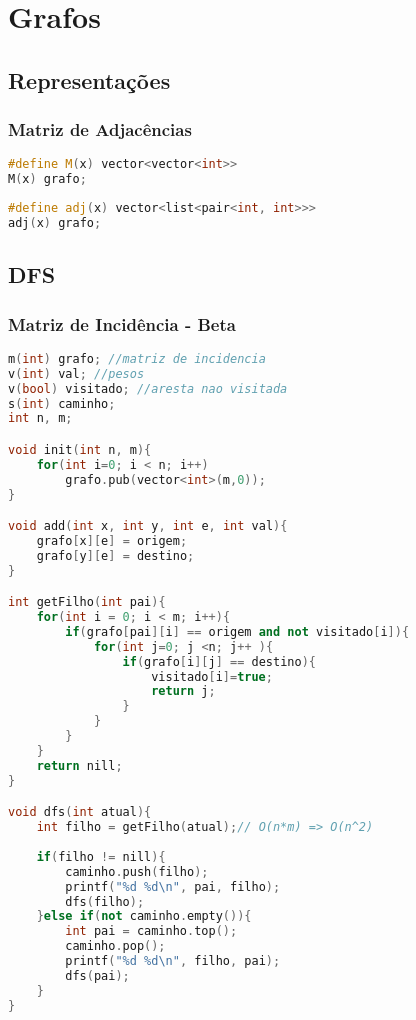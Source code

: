 \chapter{Grafos}

\section{Representações}
\subsection*{Matriz de Adjacências}

\begin{lstlisting}[language=C++, title={Matriz de Adjacências}]
#define M(x) vector<vector<int>>
M(x) grafo;
\end{lstlisting}

\begin{lstlisting}[language=C++, title={Lista de Adjacências}]
#define adj(x) vector<list<pair<int, int>>>
adj(x) grafo;
\end{lstlisting}

\section{DFS}
\subsection*{Matriz de Incidência - Beta}
\begin{lstlisting}[language=C++]
m(int) grafo; //matriz de incidencia
v(int) val; //pesos
v(bool) visitado; //aresta nao visitada
s(int) caminho;
int n, m;

void init(int n, m){
	for(int i=0; i < n; i++) 
		grafo.pub(vector<int>(m,0));
}

void add(int x, int y, int e, int val){
	grafo[x][e] = origem;
	grafo[y][e] = destino;
}

int getFilho(int pai){
	for(int i = 0; i < m; i++){
		if(grafo[pai][i] == origem and not visitado[i]){
			for(int j=0; j <n; j++ ){
				if(grafo[i][j] == destino){
					visitado[i]=true;
					return j;
				}
			}
		}
	}
	return nill;
}

void dfs(int atual){
	int filho = getFilho(atual);// O(n*m) => O(n^2)
	
	if(filho != nill){
		caminho.push(filho);
		printf("%d %d\n", pai, filho);
		dfs(filho);
	}else if(not caminho.empty()){
		int pai = caminho.top();
		caminho.pop();
		printf("%d %d\n", filho, pai);
		dfs(pai);
	}
}
\end{lstlisting}
